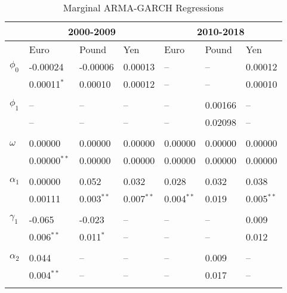 \documentclass[12pt]{article}
\begin{document}
\begin{table}
	\fontsize{10pt}{10pt}\selectfont
	\centering
	\caption{Marginal ARMA-GARCH Regressions}
	\begin{tabular}{l l l l | l l l}
		\midrule
				   & \multicolumn{3}{c}{2000-2009} & \multicolumn{3}{c}{2010-2018} \\
		\midrule
				   & Euro & Pound & Yen & Euro & Pound & Yen \\
		\midrule
         $\phi_{0}$    &  -0.00024        & -0.00006     & 0.00013      &    --        &    --        & 0.00012      \\
                       &   0.00011$^{*}$  &  0.00010     & 0.00012      &    --        &    --        & 0.00010      \\ \\
		 $\phi_{1}$    &     --           &     --       &    --        &    --        & 0.00166      &    --        \\
		               &     --           &     --       &    --        &    --        & 0.02098      &    --        \\ \\
         $\omega$      &  0.00000         &  0.00000     & 0.00000      & 0.00000      & 0.00000      & 0.00000      \\
                       &  0.00000$^{**}$  &  0.00000     & 0.00000      & 0.00000      & 0.00000      & 0.00000      \\ \\
         $\alpha_{1}$  &  0.00000         &  0.052       & 0.032        & 0.028        & 0.032        & 0.038        \\
                       &  0.00111         & 0.003$^{**}$ & 0.007$^{**}$ & 0.004$^{**}$ & 0.019        & 0.005$^{**}$ \\ \\
         $\gamma_{1}$  & -0.065           & -0.023       &    --        &    --        &    --        & 0.009        \\
                       &  0.006$^{**}$    & 0.011$^{*}$  &    --        &    --        &    --        & 0.012        \\ \\
         $\alpha_{2}$  &  0.044           &    --        &    --        &    --        & 0.009        &    --        \\
                       &  0.004$^{**}$    &    --        &    --        &    --        & 0.017        &    --        \\ \\

\end{tabular}
\end{table}
\end{document}
